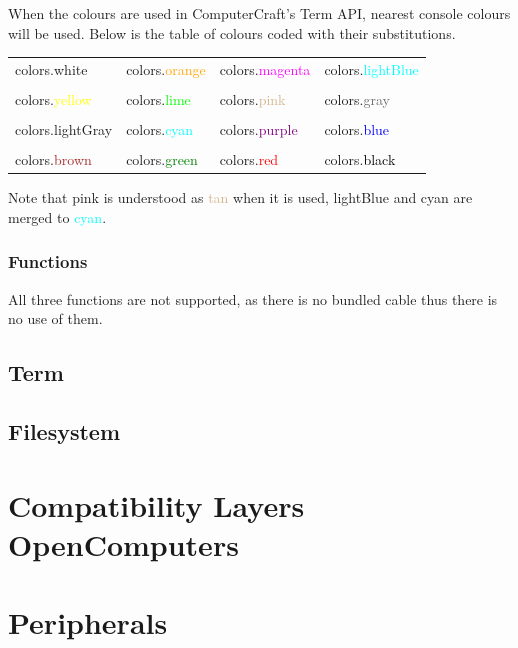 \documentclass[10pt, stock]{memoir}
\let\oldsection\section
\renewcommand\section{\clearpage\oldsection}
\begin{document}
When the colours are used in ComputerCraft's Term API, nearest console colours will be used. Below is the table of colours coded with their substitutions.

\begin{tabularx}{\textwidth}{l l l l}
	colors.white & colors.\textcolor{orange}{orange} & colors.\textcolor{magenta}{magenta} & colors.\textcolor{cyan}{lightBlue}
	\\ \\
	colors.\textcolor{yellow}{yellow} & colors.\textcolor{lime}{lime} & colors.\textcolor{tan}{pink} & colors.\textcolor{dimgrey}{gray}
	\\ \\
	colors.\textcolor{brightgrey}{lightGray} & colors.\textcolor{cyan}{cyan} & colors.\textcolor{purple}{purple} & colors.\textcolor{blue}{blue}
	\\ \\
	colors.\textcolor{brown}{brown} & colors.\textcolor{green}{green} & colors.\textcolor{red}{red} & colors.\textcolor{black}{black}
\end{tabularx}

Note that pink is understood as \textcolor{tan}{tan} when it is used, lightBlue and cyan are merged to \textcolor{cyan}{cyan}.

\subsection{Functions}

All three functions are not supported, as there is no bundled cable thus there is no use of them.

\section{Term}

\section{Filesystem}

\chapter[Compatibility Layers---OpenComputers]{{\LARGE Compatibility Layers} \\ OpenComputers}



\chapter{Peripherals}
\end{document}

